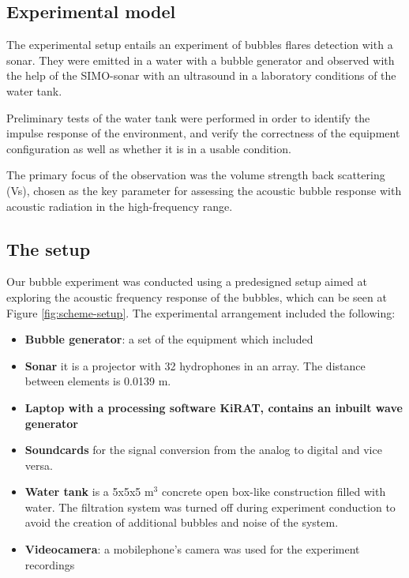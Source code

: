 \subsection{Experimental model}

The experimental setup entails an experiment of bubbles flares detection with a sonar. They were emitted in a water with a bubble generator and observed with the help of the SIMO-sonar with an ultrasound in a laboratory conditions of the water tank. 

Preliminary tests of the water tank were performed in order to identify the impulse response of the  environment, and verify the correctness of the equipment configuration as well as whether it is in a usable condition.

The primary focus of the observation was the volume strength back scattering (Vs), chosen as the key parameter for assessing the acoustic bubble response with acoustic radiation in the high-frequency range. 

\subsection{ The setup}

Our bubble experiment was conducted using a predesigned setup aimed at exploring the acoustic frequency response of the bubbles, which can be seen at Figure \ref*{fig:scheme-setup}. The experimental arrangement included the following:
\begin{itemize}
    \item \textbf{Bubble generator}: a set of the equipment which included
    \item \textbf{Sonar} it is a projector with 32 hydrophones in an array. The distance between elements is 0.0139 m.
    \item \textbf{Laptop with a processing software KiRAT, contains an inbuilt wave generator}
    \item \textbf{Soundcards} for the signal conversion from the analog to digital and vice versa.
    \item \textbf{Water tank} is a 5x5x5 m$^3$ concrete open box-like construction filled with water. The filtration system was turned off during experiment conduction to avoid the creation of additional bubbles and noise of the system.
    \item \textbf{Videocamera}: a mobilephone's camera was used for the experiment recordings
\end{itemize}

